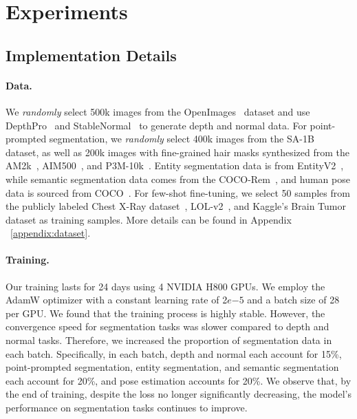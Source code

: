 

\def\x{\ensuremath{\times}}


\section{Experiments}
\subsection{Implementation Details}

\paragraph{Data.}
We \textit{randomly} select 500k images from the OpenImages~\cite{kuznetsova2020open} dataset and use DepthPro~\cite{bochkovskii2024depth} and StableNormal~\cite{ye2024stablenormal} to generate depth and normal data. For point-prompted segmentation, we \textit{randomly} select 400k images from the SA-1B~\cite{kirillov2023segment} dataset, as well as 200k images with fine-grained hair masks synthesized from the AM2k~\cite{li2022bridging}, AIM500~\cite{li2021deep}, and P3M-10k~\cite{li2021privacy}. Entity segmentation data is from EntityV2~\cite{qi2022high}, while semantic segmentation data comes from the COCO-Rem~\cite{singh2024benchmarkingobjectdetectorscoco}, and human pose data is sourced from COCO~\cite{lin2015microsoftcococommonobjects}. For few-shot fine-tuning, we select 50 samples from the publicly labeled Chest X-Ray dataset~\cite{wang2017hospital}, LOL-v2~\cite{yang2020fidelity}, and Kaggle's Brain Tumor dataset as training samples. More details can be found in Appendix ~\ref{appendix:dataset}.

\paragraph{Training.}
%
Our training lasts for 24 days
using 
4 NVIDIA 
H800 
GPUs. We employ the AdamW optimizer with a constant learning rate of 2$e$$-5$ and a batch size of 28 per GPU. We found that the training process is highly stable. However, the convergence speed for segmentation tasks was slower compared to depth and normal tasks. Therefore, we increased the proportion of segmentation data in each batch.  Specifically, in each batch, depth and normal each account for 15\%, point-prompted segmentation, entity segmentation, and semantic segmentation each account for 20\%, and pose estimation accounts for 20\%. We observe that, by the end of training, despite the loss no longer significantly decreasing, the model's performance on segmentation tasks continues to improve.


